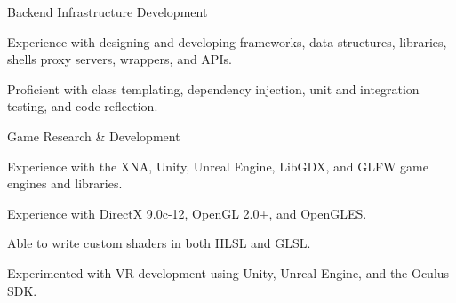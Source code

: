 \vspace{-5mm}

\begin{cventries}
  \cventry%
    {}
    {Backend Infrastructure Development}
    {}
    {}
    {
      \vspace{-5mm}
      \begin{cvitems}
        \item {Experience with designing and developing frameworks, data structures, libraries, %
        shells proxy servers, wrappers, and APIs.}
        \item {Proficient with class templating, dependency %
        injection, unit and integration testing, and code reflection.}
      \end{cvitems}
    }
      \vspace{-1.8mm}
      \cventry%
        {}
        {Game Research \& Development}
        {}
        {}
        {
          \vspace{-5mm}
          \begin{cvitems}
            \item {Experience with the XNA, Unity, Unreal Engine, LibGDX, and GLFW game engines %
            and libraries.}
            \item {Experience with DirectX 9.0c-12, OpenGL 2.0+, and OpenGLES\@.}
            \item {Able to write custom shaders in both HLSL and GLSL\@.}
            \item {Experimented with VR development using Unity, Unreal Engine, and the Oculus SDK.}
          \end{cvitems}
        }
\end{cventries}
\vspace{-5mm}
